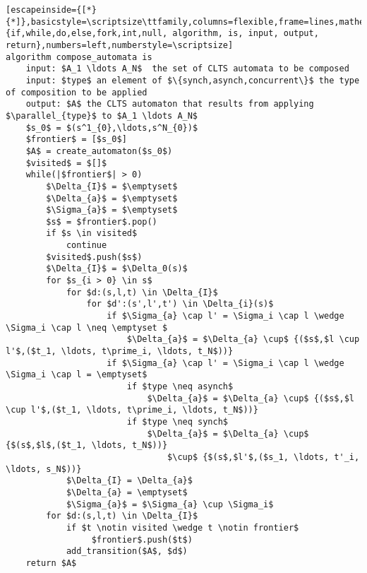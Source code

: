 \renewcommand{\ttdefault}{pcr}
\begin{lstlisting}[escapeinside={[*}{*]},basicstyle=\scriptsize\ttfamily,columns=flexible,frame=lines,mathescape=true,xleftmargin=3.0ex,keywordstyle=\textbf,morekeywords={if,while,do,else,fork,int,null, algorithm, is, input, output, return},numbers=left,numberstyle=\scriptsize]
algorithm compose_automata is
	input: $A_1 \ldots A_N$  the set of CLTS automata to be composed
	input: $type$ an element of $\{synch,asynch,concurrent\}$ the type of composition to be applied
	output: $A$ the CLTS automaton that results from applying $\parallel_{type}$ to $A_1 \ldots A_N$
	$s_0$ = $(s^1_{0},\ldots,s^N_{0})$
	$frontier$ = [$s_0$]
	$A$ = create_automaton($s_0$)
	$visited$ = $[]$
	while(|$frontier$| > 0)
		$\Delta_{I}$ = $\emptyset$
		$\Delta_{a}$ = $\emptyset$
		$\Sigma_{a}$ = $\emptyset$		
		$s$ = $frontier$.pop()
		if $s \in visited$
			continue
		$visited$.push($s$)
		$\Delta_{I}$ = $\Delta_0(s)$
		for $s_{i > 0} \in s$ 
			for $d:(s,l,t) \in \Delta_{I}$
				for $d':(s',l',t') \in \Delta_{i}(s)$
					if $\Sigma_{a} \cap l' = \Sigma_i \cap l \wedge \Sigma_i \cap l \neq \emptyset $
						$\Delta_{a}$ = $\Delta_{a} \cup$ {($s$,$l \cup l'$,($t_1, \ldots, t\prime_i, \ldots, t_N$))}
					if $\Sigma_{a} \cap l' = \Sigma_i \cap l \wedge \Sigma_i \cap l = \emptyset$
						if $type \neq asynch$
							$\Delta_{a}$ = $\Delta_{a} \cup$ {($s$,$l \cup l'$,($t_1, \ldots, t\prime_i, \ldots, t_N$))}
						if $type \neq synch$							
							$\Delta_{a}$ = $\Delta_{a} \cup$ {$(s$,$l$,($t_1, \ldots, t_N$))} 
								$\cup$ {$(s$,$l'$,($s_1, \ldots, t'_i, \ldots, s_N$))}
			$\Delta_{I} = \Delta_{a}$						
			$\Delta_{a} = \emptyset$						
			$\Sigma_{a}$ = $\Sigma_{a} \cup \Sigma_i$
		for $d:(s,l,t) \in \Delta_{I}$
			if $t \notin visited \wedge t \notin frontier$ 
				 $frontier$.push($t$)
			add_transition($A$, $d$)			
	return $A$

\end{lstlisting}